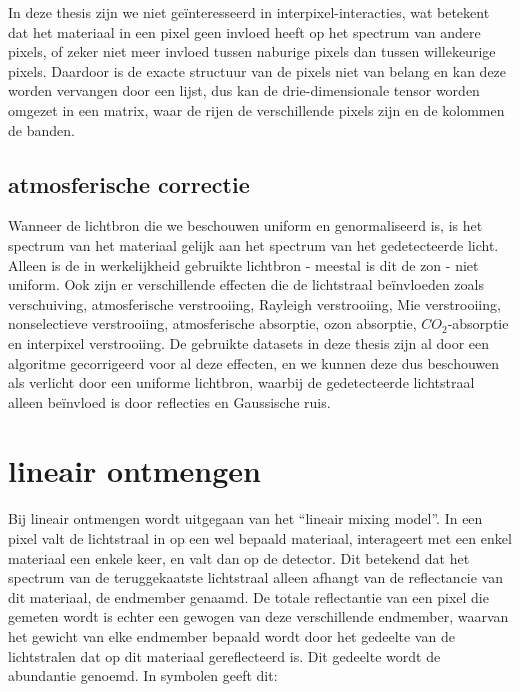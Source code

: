 \documentclass[12pt]{report}
\begin{document}
In deze thesis zijn we niet ge\"interesseerd in  interpixel-interacties, wat betekent dat het materiaal in een pixel geen invloed heeft op het spectrum van andere pixels, of zeker niet meer invloed tussen naburige pixels dan tussen willekeurige pixels. Daardoor is de exacte structuur van de pixels niet van belang en kan deze worden vervangen door een lijst, dus kan de drie-dimensionale tensor worden omgezet in een matrix, waar de rijen de verschillende pixels zijn en de kolommen de banden.  





\subsection{atmosferische correctie}

Wanneer de lichtbron die we beschouwen uniform en genormaliseerd is, is het spectrum van het materiaal gelijk aan het spectrum van het gedetecteerde licht. Alleen is de in werkelijkheid gebruikte lichtbron - meestal is dit de zon - niet uniform. Ook zijn er verschillende effecten die de lichtstraal be\"invloeden\cite{fun} zoals verschuiving, atmosferische verstrooiing, Rayleigh verstrooiing, Mie verstrooiing, nonselectieve verstrooiing, atmosferische absorptie, ozon absorptie, $CO_2$-absorptie en interpixel verstrooiing. De gebruikte datasets in deze thesis zijn al door een algoritme gecorrigeerd voor al deze effecten, en we kunnen deze dus beschouwen als verlicht door een uniforme lichtbron, waarbij de gedetecteerde lichtstraal alleen be\"invloed is door reflecties en Gaussische ruis. 

\section{lineair ontmengen}

Bij lineair ontmengen wordt uitgegaan van het ``lineair mixing model''. In een pixel valt de lichtstraal in op een wel bepaald materiaal, interageert met een enkel materiaal een enkele keer, en valt dan op de detector. Dit betekend dat het spectrum van de teruggekaatste lichtstraal alleen afhangt van de reflectancie van dit materiaal, de endmember genaamd. De totale reflectantie van een pixel die gemeten wordt is echter een gewogen van deze verschillende endmember, waarvan het gewicht van elke endmember bepaald wordt door het gedeelte van de lichtstralen dat op dit materiaal gereflecteerd is. Dit gedeelte wordt de abundantie genoemd. In symbolen geeft dit:
\end{document}
